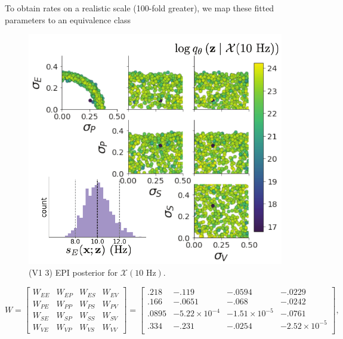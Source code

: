 \documentclass[11pt]{article}
\begin{document}
To obtain rates on a realistic scale (100-fold greater), we map these fitted parameters to an equivalence class

\begin{figure}[h]
\caption{\small (V1 3)
EPI posterior for $\mathcal{X}(10\text{ Hz})$.
 }
 \label{fig:V1_3}
\begin{center}
\includegraphics[scale=.8]{figures/figV1_3/figV1_3.pdf}
\end{center}
\end{figure}

\begin{equation}
W =  \begin{bmatrix} W_{EE} & W_{EP} & W_{ES} & W_{EV} \\
W_{PE} & W_{PP} & W_{PS} & W_{PV} \\
W_{SE} & W_{SP} & W_{SS} & W_{SV} \\
W_{VE} & W_{VP} & W_{VS} & W_{VV}  \end{bmatrix} = 
 \begin{bmatrix} .218 & -.119 & -.0594 & -.0229 \\
 .166 & -.0651 & -.068 & -.0242 \\
 .0895 & -5.22 \times 10^{-4} & -1.51 \times 10^{-5}   & -.0761 \\
 .334 &  -.231 & -.0254  & -2.52 \times 10^{-5} \\
 \end{bmatrix},
\end{equation} 
\end{document}
